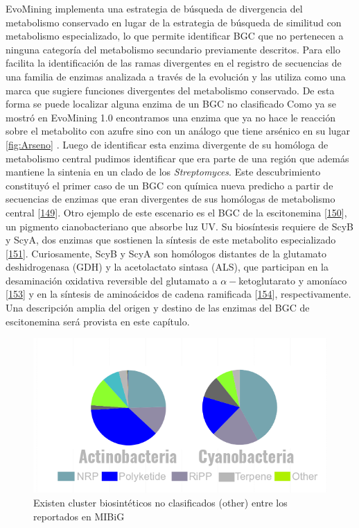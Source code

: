 \documentclass[12pt,twoside]{reedthesis}
\begin{document}
  EvoMining implementa una estrategia de búsqueda de divergencia del
  metabolismo conservado en lugar de la estrategia de búsqueda de
  similitud con metabolismo especializado, lo que permite identificar BGC
  que no pertenecen a ninguna categoría del metabolismo secundario
  previamente descritos. Para ello facilita la identificación de las ramas
  divergentes en el registro de secuencias de una familia de enzimas
  analizada a través de la evolución y las utiliza como una marca que
  sugiere funciones divergentes del metabolismo conservado. De esta forma
  se puede localizar alguna enzima de un BGC no clasificado Como ya se
  mostró en EvoMining 1.0 encontramos una enzima que ya no hace le
  reacción sobre el metabolito con azufre sino con un análogo que tiene
  arsénico en su lugar \autoref{fig:Arseno} . Luego de identificar esta
  enzima divergente de su homóloga de metabolismo central pudimos
  identificar que era parte de una región que además mantiene la sintenia
  en un clado de los \emph{Streptomyces}. Este descubrimiento constituyó
  el primer caso de un BGC con química nueva predicho a partir de
  secuencias de enzimas que eran divergentes de sus homólogas de
  metabolismo central {[}\protect\hyperlink{ref-cruz_tesis_2013}{149}{]}.
  Otro ejemplo de este escenario es el BGC de la escitonemina
  {[}\protect\hyperlink{ref-garciapichel_evidence_1992}{150}{]}, un
  pigmento cianobacteriano que absorbe luz UV. Su biosíntesis requiere de
  ScyB y ScyA, dos enzimas que sostienen la síntesis de este metabolito
  especializado
  {[}\protect\hyperlink{ref-balskus_investigating_2008}{151}{]}.
  Curiosamente, ScyB y ScyA son homólogos distantes de la glutamato
  deshidrogenasa (GDH) y la acetolactato sintasa (ALS), que participan en
  la desaminación oxidativa reversible del glutamato a
  \(\alpha-\)ketoglutarato y amoníaco
  {[}\protect\hyperlink{ref-engel_glutamate_2014}{153}{]} y en la síntesis
  de aminoácidos de cadena ramificada
  {[}\protect\hyperlink{ref-liu_acetohydroxyacid_2016}{154}{]},
  respectivamente. Una descripción amplia del origen y destino de las
  enzimas del BGC de escitonemina será provista en este capítulo.
  
  \begin{figure}[h!tbp]
  \centering
  \includegraphics[angle = 0,scale = .7]{chapter2/other.png}
  \caption[Existen cluster biosintéticos no clasificados (other) entre los reportados en MIBiG]{\footnotesize{Existen cluster biosintéticos no clasificados (other) entre los reportados en MIBiG}}
  \label{fig:other}
  \end{figure}
  
\end{document}
